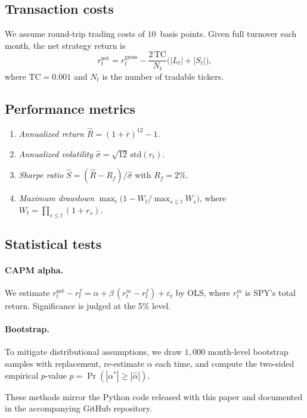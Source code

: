 \documentclass[11pt]{article}
\begin{document}
\subsection{Transaction costs}
We assume round-trip trading costs of \(10\)~basis points.  
Given full turnover each month, the net strategy return is
\[
r^{\text{net}}_t
= r^{\text{gross}}_t
- \frac{2\,\text{TC}}{N_t}\bigl(|L_t| + |S_t|\bigr),
\]
where \(\text{TC}=0.001\) and \(N_t\) is the number of tradable tickers.

\subsection{Performance metrics}
\begin{enumerate}[label=(\alph*), leftmargin=*]
  \item \emph{Annualized return} \(\hat{R} = (1+\overline{r})^{12}-1\).
  \item \emph{Annualized volatility} \(\hat{\sigma} = \sqrt{12}\,\mathrm{std}(r_t)\).
  \item \emph{Sharpe ratio} \( \hat{S} = (\hat{R}-R_f)/\hat{\sigma}\) with \(R_f=2\%\).
  \item \emph{Maximum drawdown} \(\max_t \bigl(1 - W_t / \max_{s\le t} W_s\bigr)\), where \(W_t = \prod_{s\le t}(1+r_s)\).
\end{enumerate}

\subsection{Statistical tests}
\paragraph{CAPM alpha.}
We estimate
\(
r^{\text{net}}_t - r^f_t
  = \alpha + \beta\,(r^{m}_t - r^f_t) + \varepsilon_t
\)
by OLS, where \(r^{m}_t\) is SPY’s total return.  
Significance is judged at the 5\% level.

\paragraph{Bootstrap.}
To mitigate distributional assumptions, we draw \(1{,}000\) month-level bootstrap samples with replacement, re-estimate \(\alpha\) each time, and compute the two-sided empirical \(p\)-value
\(
p = \Pr(|\alpha^{*}| \ge |\hat{\alpha}|).
\)

These methods mirror the Python code released with this paper and documented in the accompanying GitHub repository.
\end{document}
